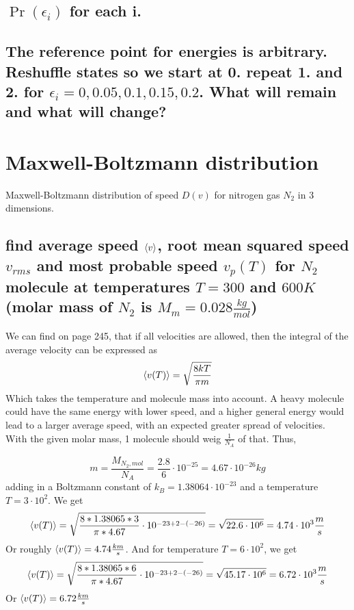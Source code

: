 \documentclass[a4paper,11pt]{article}
\begin{document}
\subsection{ $\Pr(\epsilon_i)$ for each i. }%


\subsection{ The reference point for energies is arbitrary. Reshuffle states so we start at 0. repeat 1. and 2. for
            $\epsilon_i = 0, 0.05, 0.1, 0.15, 0.2$. What will remain and what will change? }%


\section{ Maxwell-Boltzmann distribution }
Maxwell-Boltzmann distribution of speed $D(v)$ for nitrogen gas $N_2$ in 3 dimensions.

\subsection{ find average speed  $\expval{v}$, root mean squared speed $v_{rms}$ and most probable speed $v_p(T)$ for $N_2$
            molecule at temperatures $T = 300$ and $600 K$ (molar mass of $N_2$ is $M_m = 0.028 \frac{kg}{mol}$) }%

We can find on page 245, that if all velocities are allowed, then the integral of the average velocity can be expressed as
\[ \ev{v(T)} = \sqrt{ \frac{ 8kT }{ \pi m } } \]
Which takes the temperature and molecule mass into account. A heavy molecule could have the same energy with lower speed, and
a higher general energy would lead to a larger average speed, with an expected greater spread of velocities. With the given molar 
mass, 1 molecule should weig $\frac{1}{N_A}$ of that. Thus, 

\[ m = \frac{ M_{N_2, mol} }{ N_A } = \frac{ 2.8 }{ 6 } \cdot 10^{-25} = 4.67\cdot 10^{-26} kg \]
adding in a Boltzmann constant of $k_B = 1.38064\cdot 10^{-23}$ and a temperature $T = 3\cdot 10^{2}$. We get
\[ \ev{v(T)} = \sqrt{ \frac{ 8 * 1.38065 * 3 }{ \pi * 4.67 }\cdot 10^{-23+2-(-26)} } 
    = \sqrt{ 22.6 \cdot 10^6 } = 4.74 \cdot 10^3 \frac{m}{s} \]
Or roughly \underline{$\ev{v(T)} = 4.74\frac{km}{s}$}. And for temperature $T = 6\cdot 10^2$, we get 
\[ \ev{v(T)} = \sqrt{ \frac{ 8 * 1.38065 * 6 }{ \pi * 4.67 }\cdot 10^{-23+2-(-26)} } 
    = \sqrt{ 45.17\cdot 10^6 } = 6.72 \cdot 10^3 \frac{m}{s} \]
Or \underline{$\ev{v(T)} = 6.72 \frac{km}{s}$}
\end{document}
